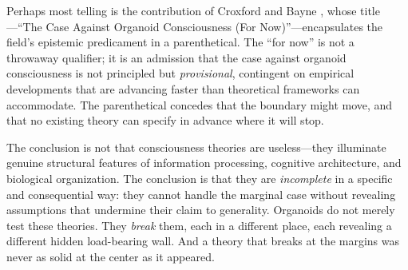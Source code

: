Perhaps most telling is the contribution of Croxford and Bayne \cite{croxford2024case}, whose title---``The Case Against Organoid Consciousness (For Now)''---encapsulates the field's epistemic predicament in a parenthetical. The ``for now'' is not a throwaway qualifier; it is an admission that the case against organoid consciousness is not principled but \textit{provisional}, contingent on empirical developments that are advancing faster than theoretical frameworks can accommodate. The parenthetical concedes that the boundary might move, and that no existing theory can specify in advance where it will stop.

The conclusion is not that consciousness theories are useless---they illuminate genuine structural features of information processing, cognitive architecture, and biological organization. The conclusion is that they are \textit{incomplete} in a specific and consequential way: they cannot handle the marginal case without revealing assumptions that undermine their claim to generality. Organoids do not merely test these theories. They \textit{break} them, each in a different place, each revealing a different hidden load-bearing wall. And a theory that breaks at the margins was never as solid at the center as it appeared.
